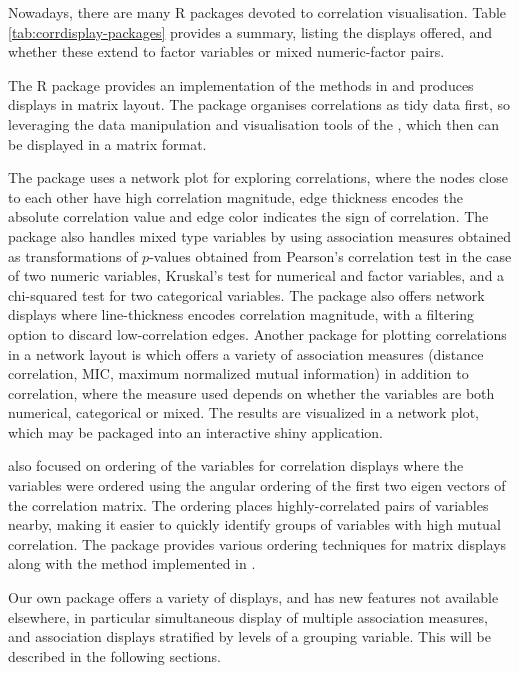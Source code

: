 Nowadays, there are many R packages devoted to correlation
visualisation. Table \ref{tab:corrdisplay-packages} provides a summary,
listing the displays offered, and whether these extend to factor
variables or mixed numeric-factor pairs.

The R package  \citep{corrplot2021} provides an
implementation of the methods in \citet{friendly2002corrgrams} and
produces displays in matrix layout. The package 
\citep{corrr2020} organises correlations as tidy data first, so
leveraging the data manipulation and visualisation tools of the
 \citep{tidyverse}, which then can be displayed in a
matrix format.

The package  \citep{corrgrapher} uses a network
plot for exploring correlations, where the nodes close to each other
have high correlation magnitude, edge thickness encodes the absolute
correlation value and edge color indicates the sign of correlation. The
package also handles mixed type variables by using association measures
obtained as transformations of \(p\)-values obtained from Pearson's
correlation test in the case of two numeric variables, Kruskal's test
for numerical and factor variables, and a chi-squared test for two
categorical variables. The package  \citep{corrr2020}
also offers network displays where line-thickness encodes correlation
magnitude, with a filtering option to discard low-correlation edges.
Another package for plotting correlations in a network layout is
 \citep{linkspotter} which offers a variety of
association measures (distance correlation, MIC, maximum normalized
mutual information) in addition to correlation, where the measure used
depends on whether the variables are both numerical, categorical or
mixed. The results are visualized in a network plot, which may be
packaged into an interactive shiny application.

\citet{friendly2002corrgrams} also focused on ordering of the variables
for correlation displays where the variables were ordered using the
angular ordering of the first two eigen vectors of the correlation
matrix. The ordering places highly-correlated pairs of variables nearby,
making it easier to quickly identify groups of variables with high
mutual correlation. The package  \citep{corrplot2021}
provides various ordering techniques for matrix displays along with the
method implemented in \citet{friendly2002corrgrams}.

Our own package  offers a variety of displays, and has
new features not available elsewhere, in particular simultaneous display
of multiple association measures, and association displays stratified by
levels of a grouping variable. This will be described in the following
sections.

